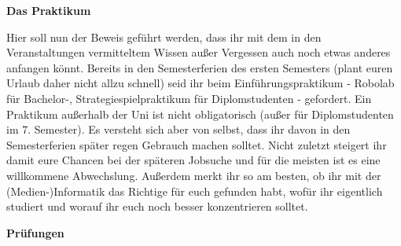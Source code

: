 

\textbf{Das Praktikum}

Hier soll nun der Beweis geführt werden, dass ihr mit dem in den Veranstaltungen vermitteltem Wissen außer Vergessen auch noch etwas anderes anfangen könnt. Bereits in den Semesterferien des ersten Semesters (plant euren Urlaub daher nicht allzu schnell) seid ihr beim Einführungspraktikum - Robolab für Bachelor-, Strategiespielpraktikum für Diplomstudenten - gefordert. Ein Praktikum außerhalb der Uni ist nicht obligatorisch (außer für Diplomstudenten im 7. Semester). Es versteht sich aber von selbst, dass ihr davon in den Semesterferien später regen Gebrauch machen solltet. Nicht zuletzt steigert ihr damit eure Chancen bei der späteren Jobsuche und für die meisten ist es eine willkommene Abwechslung. Außerdem merkt ihr so am besten, ob ihr mit der (Medien-)Informatik das Richtige für euch gefunden habt, wofür ihr eigentlich studiert und worauf ihr euch noch besser konzentrieren solltet.

\textbf{Prüfungen}

